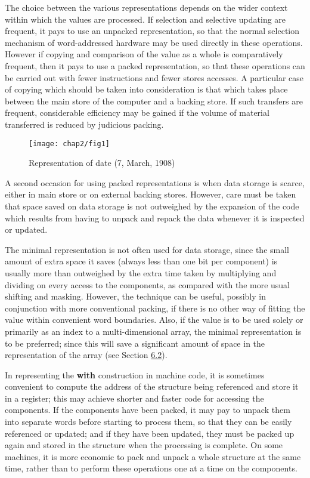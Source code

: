 The choice between the various representations depends on the wider context within which the values are processed. If selection and selective updating are frequent, it pays to use an unpacked representation, so that the normal selection mechanism of word-addressed hardware may be used directly in these operations. However if copying and comparison of the value as a whole is comparatively frequent, then it pays to use a packed representation, so that these operations can be carried out with fewer instructions and fewer stores accesses. A particular case of copying which should be taken into consideration is that which takes place between the main store of the computer and a backing store. If such transfers are frequent, considerable efficiency may be gained if the volume of material transferred is reduced by judicious packing.

\begin{figure}[h]
	\centering
	\texttt{[image: chap2/fig1]}
	\caption{Representation of date (7, March, 1908)}
\end{figure}

A second occasion for using packed representations is when data storage is scarce, either in main store or on external backing stores. However, care must be taken that space saved on data storage is not outweighed by the expansion of the code which results from having to unpack and repack the data whenever it is inspected or updated.

The minimal representation is not often used for data storage, since the small amount of extra space it saves (always less than one bit per component) is usually more than outweighed by the extra time taken by multiplying and dividing on every access to the components, as compared with the more usual shifting and masking. However, the technique can be useful, possibly in conjunction with more conventional packing, if there is no other way of fitting the value within convenient word boundaries. Also, if the value is to be used solely or primarily as an index to a multi-dimensional array, the minimal representation is to be preferred; since this will save a significant amount of space in the representation of the array (see Section \hyperref[subsec:representation-6.2]{6.2}).

In representing the \textbf{with} construction in machine code, it is sometimes convenient to compute the address of the structure being referenced and store it in a register; this may achieve shorter and faster code for accessing the components. If the components have been packed, it may pay to unpack them into separate words before starting to process them, so that they can be easily referenced or updated; and if they have been updated, they must be packed up again and stored in the structure when the processing is complete. On some machines, it is more economic to pack and unpack a whole structure at the same time, rather than to perform these operations one at a time on the components.

